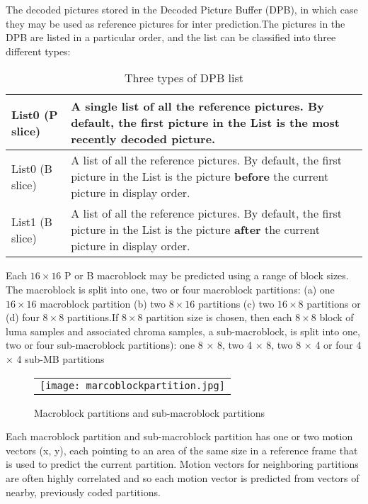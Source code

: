 \documentclass[../main.tex]{subfiles}
\begin{document}
The decoded pictures stored in the Decoded
Picture Buffer (DPB), in which case they may be used as
reference pictures for inter prediction.The pictures in the DPB are listed in a particular order, and
the list can be classified into three different types:

\begin{table}[ht]
\label{tab:list}
\begin{center}       
\begin{tabular}{|l|l|} 
\hline
\rule[-1ex]{0pt}{3.5ex}  List0 (P slice) & A single list of all the reference pictures.  By default, the first picture in
the List is the most recently decoded picture.\\  %
\hline
\rule[-1ex]{0pt}{3.5ex}  List0 (B slice) & A list of all the reference pictures. By default, the first picture in the List
is the picture \textbf {before} the current picture in display order.   \\%
\hline
\rule[-1ex]{0pt}{3.5ex}  List1 (B slice) & A list of all the reference pictures. By default, the first picture in the List
is the picture \textbf {after} the current picture in display order.  \\%
\hline

\end{tabular}
\end{center}
\caption{Three types of DPB list} 
\end{table}

Each $16 \times 16$ P or B macroblock may be predicted using a range
of block sizes. The macroblock is split into one, two or four
macroblock partitions:
(a) one $16 \times 16$ macroblock partition 
(b) two $8 \times 16$ partitions
(c) two $16 \times 8$ partitions or
(d) four $8 \times 8$ partitions.If $8 \times 8$ partition size is chosen, then each $8 \times 8$ block of luma samples and associated chroma
samples, a sub-macroblock, is split into one, two or four sub-macroblock partitions): one
8 × 8, two 4 × 8, two 8 × 4 or four 4 × 4 sub-MB partitions

\begin{figure} [ht]
   \begin{center}
   \begin{tabular}{c} %
   \texttt{[image: marcoblockpartition.jpg]}
   \end{tabular}
   \end{center}
   \caption[example] 
   { \label{fig:example1} 
Macroblock partitions and sub-macroblock partitions}
   \end{figure}     %
   
Each macroblock partition and sub-macroblock partition has one or two motion vectors
(x, y), each pointing to an area of the same size in a reference frame that is used to predict the
current partition. 
Motion vectors for neighboring partitions are often highly
correlated and so each motion vector is predicted from vectors of nearby, previously coded
partitions. 
\end{document}
